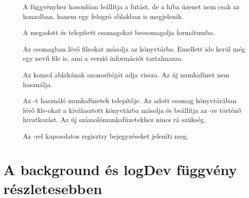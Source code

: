 \begin{description}
\item[] A 
  függvényhez hasonlóan leállítja a futást, de a hiba üzenet nem csak
  az  konzolban, hanem egy felugró ablakban is megjelenik.  
\item[] A
  megadott és telepített  csomagokat becsomagolja 
  formátumba.  
\item[] Az  csomagban lévő  fileokat
  másolja az  könyvtárba. Emellett ide kerül még egy
   nevű file is, ami a verzió információt tartalmazza.
\item[] Az  konzol ablakának azonosítóját adja
  vissza. Az új  
  munkafüzet nem használja.  
\item[] Az -t használó
  munkafüzetek telepítője. Az adott csomag  könyvtárában lévő
   file-okat a kiválasztott könyvtárba másolja és beállítja az
  -re  történő hivatkozást. Az új számolómunkafüzetekhez
  nincs rá szükség.
\item[] Az -rel kapcsolatos
  regisztry bejegyzéseket jeleníti meg.  
\end{description}

\section{A background és logDev függvény
  részletesebben}\label{sec:4.4}

